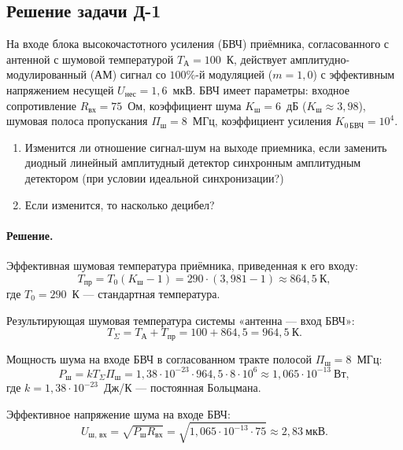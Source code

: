 \subsection{Решение задачи Д-1}
На входе блока высокочастотного усиления (БВЧ) приёмника, согласованного с антенной с шумовой температурой $T_{\text{А}} = 100$~К, действует амплитудно-модулированный (АМ) сигнал со $100\%$-й модуляцией ($m = 1{,}0$) с эффективным напряжением несущей $U_{\text{нес}} = 1{,}6$~мкВ. БВЧ имеет параметры: входное сопротивление $R_{\text{вх}} = 75$~Ом, коэффициент шума $K_{\text{ш}} = 6$~дБ ($K_{\text{ш}} \approx 3{,}98$), шумовая полоса пропускания $\Pi_{\text{ш}} = 8$~МГц, коэффициент усиления $K_{0\,\text{БВЧ}} = 10^4$.
\begin{enumerate}
    \item Изменится ли отношение сигнал-шум на выходе приемника, если заменить диодный линейный амплитудный детектор синхронным амплитудным детектором (при условии идеальной синхронизации?)
    \item Если изменится, то насколько децибел?
\end{enumerate}

\paragraph{Решение. }
Эффективная шумовая температура приёмника, приведенная к его входу:
\begin{equation}
    T_{\text{пр}} = T_0 (K_{\text{ш}} - 1) = 290 \cdot (3{,}981 - 1) \approx 864{,}5~\text{К},
\end{equation}
где $T_0 = 290$~К — стандартная температура.

Результирующая шумовая температура системы «антенна — вход БВЧ»:
\begin{equation}
    T_{\Sigma} = T_{\text{А}} + T_{\text{пр}} = 100 + 864{,}5 = 964{,}5~\text{К}.
\end{equation}

Мощность шума на входе БВЧ в согласованном тракте полосой $\Pi_{\text{ш}} = 8$~МГц:
\begin{equation}
    P_{\text{ш}} = k T_{\Sigma} \Pi_{\text{ш}} = 1{,}38 \cdot 10^{-23} \cdot 964{,}5 \cdot 8 \cdot 10^6 \approx 1{,}065 \cdot 10^{-13}~\text{Вт},
\end{equation}
где $k = 1{,}38 \cdot 10^{-23}$~Дж/К — постоянная Больцмана.

Эффективное напряжение шума на входе БВЧ:
\begin{equation}
    U_{\text{ш, вх}} = \sqrt{P_{\text{ш}} R_{\text{вх}}} = \sqrt{1{,}065 \cdot 10^{-13} \cdot 75} \approx 2{,}83~\text{мкВ}.
\end{equation}

